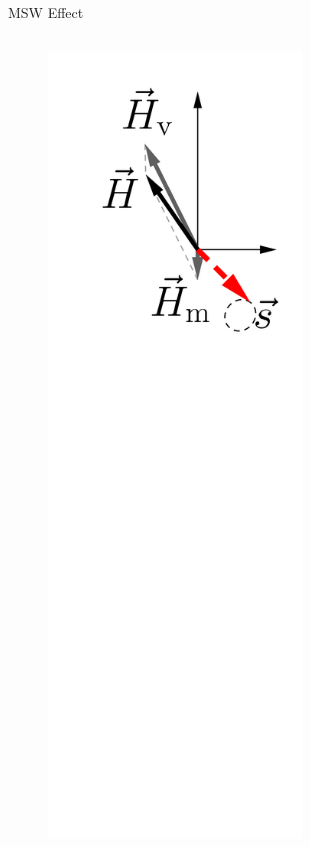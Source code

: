\documentclass[9pt]{beamer}
\begin{document}
\begin{darkframes}
\begin{frame}{MSW Effect}
{\begin{columns}[T]
\begin{column}{0.33\textwidth}
\begin{figure}
    \centering
    \colorbox{white}{\includegraphics[width=0.6\textwidth]{assets/matter-effect-adiabatic-3}}
\end{figure}



\end{column}
\end{columns}

}
\end{frame}
\end{darkframes}
\end{document}
